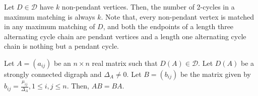 \documentclass[10pt,a4paper]{amsart}
\begin{document}
\begin{rem}\label{properties}
Let $D\in \mathcal{D}$ have $k$ non-pendant vertices. Then, the number of 2-cycles in a maximum matching is always $k$. Note that, every non-pendant vertex is matched in any maximum matching of $D$, and both the endpoints of a length three alternating cycle chain are pendant vertices and a length one alternating cycle chain is nothing but a pendant cycle.
\end{rem}

\begin{lem}\label{1}
Let $A=(a_{ij})$ be an $n\times n$ real matrix such that $D(A)\in \mathcal{D}$. Let $D(A)$ be a strongly connected digraph and $\Delta _A \neq 0$. Let $B=(b_{ij})$ be the matrix given by $b_{ij}=\frac{\mu _{ij}}{\Delta _A}, 1\leq i,j\leq n$. Then, $AB=BA$.
\end{lem}
\end{document}
